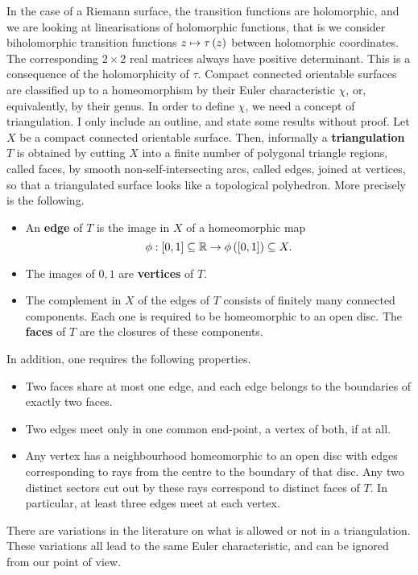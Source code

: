 In the case of a Riemann surface, the transition functions are holomorphic, and we are looking at linearisations of holomorphic functions, that is we consider biholomorphic transition functions $ z \mapsto \tau\left( z \right) $ between holomorphic coordinates. The corresponding $ 2 \times 2 $ real matrices always have positive determinant. This is a consequence of the holomorphicity of $ \tau $. Compact connected orientable surfaces are classified up to a homeomorphism by their Euler characteristic $ \chi $, or, equivalently, by their genus. In order to define $ \chi $, we need a concept of triangulation. I only include an outline, and state some results without proof. Let $ X $ be a compact connected orientable surface. Then, informally a \textbf{triangulation} $ T $ is obtained by cutting $ X $ into a finite number of polygonal triangle regions, called faces, by smooth non-self-intersecting arcs, called edges, joined at vertices, so that a triangulated surface looks like a topological polyhedron. More precisely is the following.
\begin{itemize}
\item An \textbf{edge} of $ T $ is the image in $ X $ of a homeomorphic map
$$ \phi : \left[ 0, 1 \right] \subseteq \mathbb{R} \to \phi\left( \left[ 0, 1 \right] \right) \subseteq X. $$
\item The images of $ 0, 1 $ are \textbf{vertices} of $ T $.
\item The complement in $ X $ of the edges of $ T $ consists of finitely many connected components. Each one is required to be homeomorphic to an open disc. The \textbf{faces} of $ T $ are the closures of these components.
\end{itemize}
In addition, one requires the following properties.
\begin{itemize}
\item Two faces share at most one edge, and each edge belongs to the boundaries of exactly two faces.
\item Two edges meet only in one common end-point, a vertex of both, if at all.
\item Any vertex has a neighbourhood homeomorphic to an open disc with edges corresponding to rays from the centre to the boundary of that disc. Any two distinct sectors cut out by these rays correspond to distinct faces of $ T $. In particular, at least three edges meet at each vertex.
\end{itemize}

\begin{remark}
There are variations in the literature on what is allowed or not in a triangulation. These variations all lead to the same Euler characteristic, and can be ignored from our point of view.
\end{remark}

